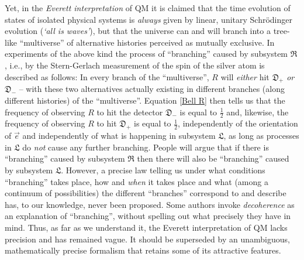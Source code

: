 \documentclass[12pt]{article}
\begin{document}
Yet, in the \textit{Everett interpretation} of QM \cite{Everett} it is claimed that the time evolution of states of
isolated physical systems is \textit{always} given by linear, unitary Schr\"odinger evolution (\textit{`all is waves'}),
but that the universe can and will branch into a tree-like ``multiverse'' of alternative histories perceived as
mutually exclusive. In experiments of the above kind the process of ``branching'' caused by subsystem $\mathfrak{R}$,
i.e., by the Stern-Gerlach measurement of the spin of the silver atom is described as follows: In every branch
of the ``multiverse'', $R$ will \textit{either} hit $\mathfrak{D}_{+}$ \textit{or} $\mathfrak{D}_{-}$ --
with these two alternatives actually existing in different branches (along different histories) of the
``multiverse''.  Equation \eqref{Bell R} then tells us that the frequency of observing $R$ to hit the detector
$\mathfrak{D}_{-}$ is equal to $\frac{1}{2}$ and, likewise, the frequency of observing
$R$ to hit $\mathfrak{D}_{+}$ is equal to $\frac{1}{2}$, {{independently}} of the orientation of $\vec{e}$ and
{{independently}} of what is happening in subsystem $\mathfrak{L}$, as long as processes in $\mathfrak{L}$ do
\textit{not} cause any further branching. People will argue that if there is ``branching'' caused by subsystem
$\mathfrak{R}$ then there will also be ``branching'' caused by subsystem $\mathfrak{L}$. However, a precise law
telling us under what conditions ``branching'' takes place, how and \textit{when} it takes place and what (among
a continuum of possibilities) the different ``branches'' correspond to and describe has, to our knowledge, never
been proposed. Some authors invoke \textit{decoherence} as an explanation of ``branching'', without spelling out
what precisely they have in mind. Thus, as far as we understand it, the Everett interpretation of QM lacks precision
and has remained vague. It should be superseded by an unambiguous, mathematically precise formalism that retains
some of its attractive features.
\end{document}
